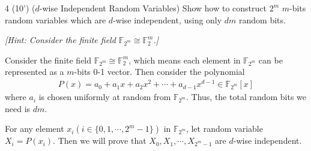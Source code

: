   \begin{question}{4 (10') ($d$-wise Independent Random Variables)}
    Show how to construct $2^m$ $m$-bits random variables which are $d$-wise independent, using only $dm$ random bits.
    	
    \textit{[Hint: Consider the finite field $\mathbb F_{2^m} \cong \mathbb F_2^m$.]}
    \end{question}

  \begin{answer}
        Consider the finite field $\mathbb F_{2^m} \cong \mathbb F_2^m$, which means 
        each element in $\mathbb F_{2^m}$ can be represented as a $m$-bits 0-1 vector.
        Then consider the polynomial 
        \begin{align*}
            P(x) = a_0 + a_1 x + a_2 x^2 + \cdots + a_{d-1} x^{d-1} \in \mathbb F_{2^m}[x]
        \end{align*}
        where $a_i$ is chosen uniformly at random from $\mathbb F_{2^m}$. Thus, the total 
        random bits we need is $dm$.

        For any element $x_i(i \in \{0,1,\cdots, 2^m-1\})$ in $\mathbb F_{2^m}$, let random variable $X_i = P(x_i)$.
        Then we will prove that $X_0, X_1, \cdots, X_{2^m-1}$ are $d$-wise independent.
        

\end{answer}
